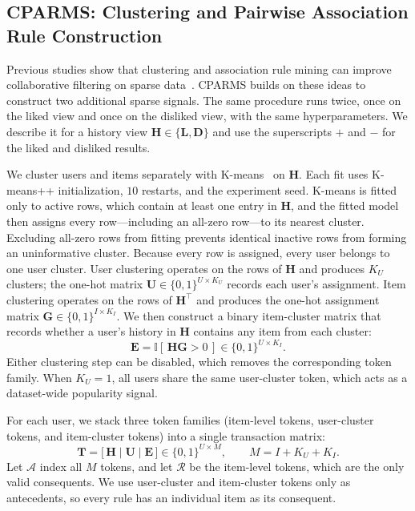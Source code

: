 \documentclass[pdflatex,sn-vancouver-num]{sn-jnl}%
\theoremstyle{thmstyleone}%
\theoremstyle{thmstyletwo}%
\theoremstyle{thmstylethree}%
\begin{document}
\subsection{CPARMS: Clustering and Pairwise Association Rule Construction}

Previous studies show that clustering and association rule mining can improve collaborative filtering on sparse data~\cite{mirbakhsh2016leveraging,najafabadi2017clusteringARM}. CPARMS builds on these ideas to construct two additional sparse signals. The same procedure runs twice, once on the liked view and once on the disliked view, with the same hyperparameters. We describe it for a history view $\mathbf{H}\in\{\mathbf{L},\mathbf{D}\}$ and use the superscripts $+$ and $-$ for the liked and disliked results.

We cluster users and items separately with K-means~\cite{macqueen1967kmeans} on $\mathbf{H}$. Each fit uses K-means++ initialization, $10$ restarts, and the experiment seed. K-means is fitted only to active rows, which contain at least one entry in $\mathbf{H}$, and the fitted model then assigns every row---including an all-zero row---to its nearest cluster. Excluding all-zero rows from fitting prevents identical inactive rows from forming an uninformative cluster. Because every row is assigned, every user belongs to one user cluster. User clustering operates on the rows of $\mathbf{H}$ and produces $K_U$ clusters; the one-hot matrix $\mathbf{U} \in \{0,1\}^{U \times K_U}$ records each user's assignment. Item clustering operates on the rows of $\mathbf{H}^{\top}$ and produces the one-hot assignment matrix $\mathbf{G} \in \{0,1\}^{I \times K_I}$. We then construct a binary item-cluster matrix that records whether a user's history in $\mathbf{H}$ contains any item from each cluster:
\begin{equation}
\mathbf{E} = \mathbb{I}\!\left[\, \mathbf{H}\mathbf{G} > 0 \,\right] \in \{0,1\}^{U \times K_I}.
\label{eq:presence}
\end{equation}
Either clustering step can be disabled, which removes the corresponding token family. When $K_U=1$, all users share the same user-cluster token, which acts as a dataset-wide popularity signal.

For each user, we stack three token families (item-level tokens, user-cluster tokens, and item-cluster tokens) into a single transaction matrix:
\begin{equation}
\mathbf{T} = \big[\, \mathbf{H} \;\big|\; \mathbf{U} \;\big|\; \mathbf{E} \,\big]
\in \{0,1\}^{U \times M}, \qquad M = I + K_U + K_I .
\label{eq:tokens}
\end{equation}
Let $\mathcal{A}$ index all $M$ tokens, and let $\mathcal{R}$ be the item-level tokens, which are the only valid consequents. We use user-cluster and item-cluster tokens only as antecedents, so every rule has an individual item as its consequent.
\end{document}
